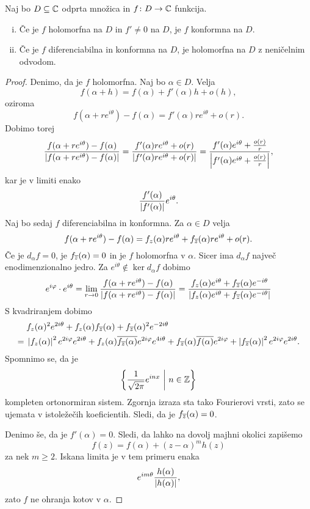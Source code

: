 \begin{izrek}
Naj bo $D \subseteq \mathbb{C}$ odprta množica in $f \colon D \to \mathbb{C}$
funkcija.

\begin{enumerate}[i)]
\item Če je $f$ holomorfna na $D$ in $f' \ne 0$ na $D$, je $f$
konformna na $D$.
\item Če je $f$ diferenciabilna in konformna na $D$, je holomorfna
na $D$ z neničelnim odvodom.
\end{enumerate}
\end{izrek}

\begin{proof}
Denimo, da je $f$ holomorfna. Naj bo $\alpha \in D$. Velja
\[
f(\alpha + h) = f(\alpha) + f'(\alpha) h + o(h),
\]
oziroma
\[
f(\alpha + r e^{i \theta}) - f(\alpha) =
f'(\alpha) r e^{i \theta} + o(r).
\]
Dobimo torej
\[
\frac{f(\alpha + r e^{i \theta}) - f(\alpha)}
{\left\lvert f(\alpha + r e^{i \theta}) - f(\alpha)\right\rvert} =
\frac{f'(\alpha) r e^{i \theta} + o(r)}
{\left\lvert f'(\alpha) r e^{i \theta} + o(r)\right\rvert} =
\frac{f'(\alpha) e^{i \theta} + \frac{o(r)}{r}}
{\left\lvert f'(\alpha) e^{i \theta} + \frac{o(r)}{r}\right\rvert},
\]
kar je v limiti enako
\[
\frac{f'(\alpha)}{\left\lvert f'(\alpha)\right\rvert} e^{i \theta}.
\]
Naj bo sedaj $f$ diferenciabilna in konformna. Za $\alpha \in D$
velja
\[
f(\alpha + r e^{i \theta}) - f(\alpha) =
f_z(\alpha) r e^{i \theta} +
f_{\overline{z}}(\alpha) r e^{i \theta} + o(r).
\]
Če je $d_\alpha f = 0$, je $f_{\overline{z}}(\alpha) = 0$ in je $f$
holomorfna v $\alpha$. Sicer ima $d_\alpha f$ največ
enodimenzionalno jedro. Za $e^{i \theta} \not \in \ker d_\alpha f$
dobimo
\[
e^{i \varphi} \cdot e^{i \theta} =
\lim_{r \to 0}
\frac{f(\alpha + r e^{i \theta}) - f(\alpha)}
{\left\lvert f(\alpha + r e^{i \theta}) - f(\alpha)\right\rvert} =
\frac{f_z(\alpha) e^{i \theta} +
f_{\overline{z}}(\alpha) e^{-i \theta}}
{\left\lvert f_z(\alpha) e^{i \theta} +
f_{\overline{z}}(\alpha) e^{-i \theta}\right\rvert}
\]
S kvadriranjem dobimo
\begin{align*}
&f_z(\alpha)^2 e^{2 i \theta} +
f_z(\alpha)f_{\overline{z}}(\alpha) +
f_{\overline{z}}(\alpha)^2 e^{-2 i \theta}
\\
={}&
\left\lvert f_z(\alpha)\right\rvert^2 e^{2 i \varphi} e^{2 i \theta} +
f_z(\alpha) \overline{f_{\overline{z}}(\alpha)}
e^{2 i \varphi} e^{4 i \theta} +
f_{\overline{z}}(\alpha) \overline{f(\alpha)} e^{2 i \varphi} +
\left\lvert f_{\overline{z}}(\alpha)\right\rvert^2 e^{2 i \varphi} e^{2 i \theta}.
\end{align*}
Spomnimo se, da je
\[
\left\{\frac{1}{\sqrt{2 \pi}} e^{inx}~\middle\vert~n \in \mathbb{Z}\right\}
\]
kompleten ortonormiran sistem. Zgornja izraza sta tako Fourierovi
vrsti, zato se ujemata v istoležečih koeficientih. Sledi, da je
$f_{\overline{z}}(\alpha) = 0$.

Denimo še, da je $f'(\alpha) = 0$. Sledi, da lahko na dovolj majhni
okolici zapišemo
\[
f(z) = f(\alpha) + (z - \alpha)^m h(z)
\]
za nek $m \geq 2$. Iskana limita je v tem primeru enaka
\[
e^{im \theta} \frac{h(\alpha)}{\left\lvert h(\alpha)\right\rvert},
\]
zato $f$ ne ohranja kotov v $\alpha$.
\end{proof}

